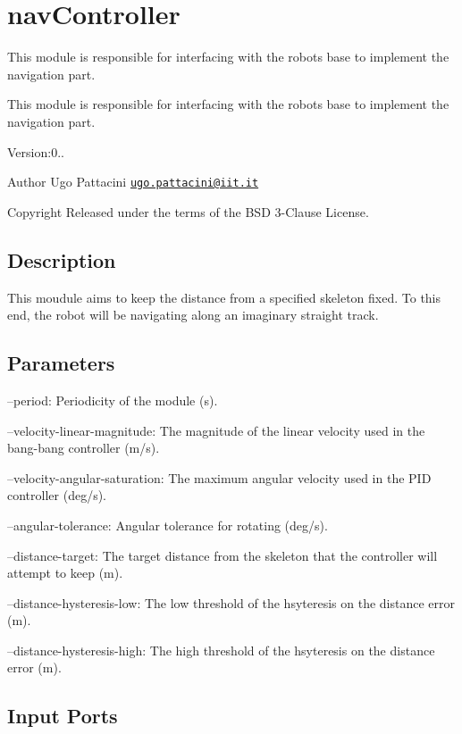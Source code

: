 \section{nav\+Controller}
\label{group__navController}


This module is responsible for interfacing with the robot\textquotesingle{}s base to implement the navigation part.  


This module is responsible for interfacing with the robot\textquotesingle{}s base to implement the navigation part. 

Version\+:0.. \begin{DoxyAuthor}{Author}
Ugo Pattacini \href{mailto:ugo.pattacini@iit.it}{\tt ugo.\+pattacini@iit.\+it} ~\newline
 
\end{DoxyAuthor}
\begin{DoxyCopyright}{Copyright}
Released under the terms of the B\+SD 3-\/\+Clause License. 
\end{DoxyCopyright}
\hypertarget{group__skeletonViewer_intro_sec}{}\subsection{Description}\label{group__skeletonViewer_intro_sec}
This moudule aims to keep the distance from a specified skeleton fixed. To this end, the robot will be navigating along an imaginary straight track.\hypertarget{group__skeletonViewer_parameters_sec}{}\subsection{Parameters}\label{group__skeletonViewer_parameters_sec}

\begin{DoxyItemize}
\item --period\+: Periodicity of the module (s).
\item --velocity-\/linear-\/magnitude\+: The magnitude of the linear velocity used in the bang-\/bang controller (m/s).
\item --velocity-\/angular-\/saturation\+: The maximum angular velocity used in the P\+ID controller (deg/s).
\item --angular-\/tolerance\+: Angular tolerance for rotating (deg/s).
\item --distance-\/target\+: The target distance from the skeleton that the controller will attempt to keep (m).
\item --distance-\/hysteresis-\/low\+: The low threshold of the hsyteresis on the distance error (m).
\item --distance-\/hysteresis-\/high\+: The high threshold of the hsyteresis on the distance error (m). 
\end{DoxyItemize}\hypertarget{group__skeletonViewer_inputports_sec}{}\subsection{Input Ports}\label{group__skeletonViewer_inputports_sec}

